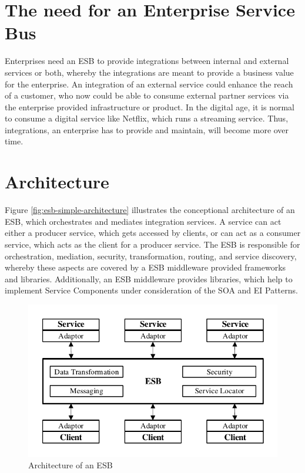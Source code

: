 \section{The need for an Enterprise Service Bus}
\label{sec:esb-need-for-esb}
Enterprises need an ESB to provide integrations between internal and external services or both, whereby the integrations are meant to provide a business value for the enterprise. An integration of an external service could enhance the reach of a customer, who now could be able to consume external partner services via the enterprise provided infrastructure or product. In the digital age, it is normal to consume a digital service like Netflix, which runs a streaming service. Thus, integrations, an enterprise has to provide and maintain, will become more over time.

\section{Architecture}
\label{sec:esb-architecture}
Figure \vref{fig:esb-simple-architecture} illustrates the conceptional architecture of an ESB, which orchestrates and mediates integration services. A service can act either a producer service, which gets accessed by clients, or can act as a consumer service, which acts as the client for a producer service. The ESB is responsible for orchestration, mediation, security, transformation, routing, and service discovery, whereby these aspects are covered by a ESB middleware provided frameworks and libraries. Additionally, an ESB middleware provides libraries, which help to implement Service Components under consideration of the SOA and EI Patterns\cite{EsbSoa2018, MediationESB2005}.

\begin{figure}[htbp]
	\centering
	\includegraphics[scale=1]{images/esb-simple-architecture.pdf}
	\caption{Architecture of an ESB}
	\label{fig:esb-simple-architecture}
\end{figure} 

